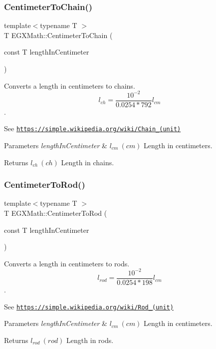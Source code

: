\subsubsection{\texorpdfstring{Centimeter\+To\+Chain()}{CentimeterToChain()}}
{\footnotesize\ttfamily template$<$typename T $>$ \\
T E\+G\+X\+Math\+::\+Centimeter\+To\+Chain (\begin{DoxyParamCaption}\item[{const T}]{length\+In\+Centimeter }\end{DoxyParamCaption})}



Converts a length in centimeters to chains. \[ l_{ch}= \frac{10^{-2}}{0.0254 * 792} l_{cm} \]. 

See \href{https://simple.wikipedia.org/wiki/Chain_(unit)}{\tt https\+://simple.\+wikipedia.\+org/wiki/\+Chain\+\_\+(unit)} 
\begin{DoxyParams}{Parameters}
{\em length\+In\+Centimeter} & $ l_{cm}\ (cm)$ Length in centimeters. \\
\hline
\end{DoxyParams}
\begin{DoxyReturn}{Returns}
$ l_{ch}\ (ch)$ Length in chains. 
\end{DoxyReturn}
\mbox{\label{group___e_g_x_math-_conversions-_length_conversions-_centimeter-_surveyors_gae8148fd547fed6b4308b4ba4b54c2273}} 
\subsubsection{\texorpdfstring{Centimeter\+To\+Rod()}{CentimeterToRod()}}
{\footnotesize\ttfamily template$<$typename T $>$ \\
T E\+G\+X\+Math\+::\+Centimeter\+To\+Rod (\begin{DoxyParamCaption}\item[{const T}]{length\+In\+Centimeter }\end{DoxyParamCaption})}



Converts a length in centimeters to rods. \[ l_{rod}= \frac{10^{-2}}{0.0254 * 198} l_{cm} \]. 

See \href{https://simple.wikipedia.org/wiki/Rod_(unit)}{\tt https\+://simple.\+wikipedia.\+org/wiki/\+Rod\+\_\+(unit)} 
\begin{DoxyParams}{Parameters}
{\em length\+In\+Centimeter} & $ l_{cm}\ (cm)$ Length in centimeters. \\
\hline
\end{DoxyParams}
\begin{DoxyReturn}{Returns}
$ l_{rod}\ (rod)$ Length in rods. 
\end{DoxyReturn}
